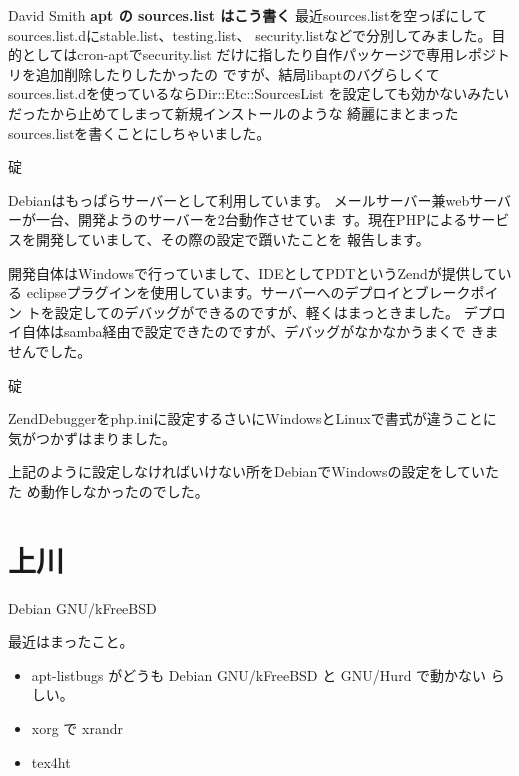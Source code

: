 \documentclass[cjk,dvipdfmx,12pt]{beamer}
\newenvironment{commandline}%
{\VerbatimEnvironment
  \begin{Sbox}\begin{minipage}{0.9\hsize}\begin{fontsize}{7.3}{7.3} \begin{BVerbatim}}%
{\end{BVerbatim}\end{fontsize}\end{minipage}\end{Sbox}
  \setlength{\fboxsep}{8pt}

\vspace{6pt}%
\fcolorbox{dancerdarkblue}{dancerlightblue}{\TheSbox}

\vspace{6pt}%
}
\begin{document}
\begin{frame}{David Smith}
\textbf{apt の sources.list はこう書く}
最近sources.listを空っぽにしてsources.list.dにstable.list、testing.list、
security.listなどで分別してみました。目的としてはcron-aptでsecurity.list
だけに指したり自作パッケージで専用レポジトリを追加削除したりしたかったの
ですが、結局libaptのバグらしくてsources.list.dを使っているならDir::Etc::SourcesList
を設定しても効かないみたいだったから止めてしまって新規インストールのような
綺麗にまとまったsources.listを書くことにしちゃいました。

\end{frame}\begin{frame}{碇}

Debianはもっぱらサーバーとして利用しています。
メールサーバー兼webサーバーが一台、開発ようのサーバーを2台動作させていま
す。現在PHPによるサービスを開発していまして、その際の設定で躓いたことを
報告します。

開発自体はWindowsで行っていまして、IDEとしてPDTというZendが提供している
eclipseプラグインを使用しています。サーバーへのデプロイとブレークポイン
トを設定してのデバッグができるのですが、軽くはまっときました。
デプロイ自体はsamba経由で設定できたのですが、デバッグがなかなかうまくで
きませんでした。
\end{frame}\begin{frame}[containsverbatim]{碇}

ZendDebuggerをphp.iniに設定するさいにWindowsとLinuxで書式が違うことに
気がつかずはまりました。


上記のように設定しなければいけない所をDebianでWindowsの設定をしていたた
め動作しなかったのでした。

\end{frame}


\section{上川}

\begin{frame}{Debian GNU/kFreeBSD}

 最近はまったこと。

\begin{itemize}

 \item apt-listbugs がどうも Debian GNU/kFreeBSD と GNU/Hurd で動かない
らしい。

 \item xorg で xrandr 
 \item tex4ht
\end{itemize} 

\end{frame}
\end{document}

